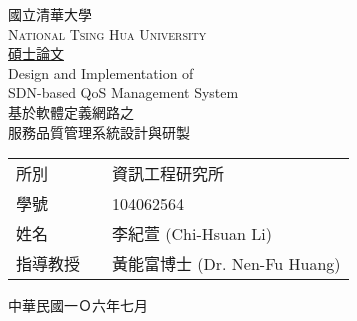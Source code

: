 \begin{center}
{\fontsize{32}{36}\selectfont 國立清華大學} \\
\large{\scshape National Tsing Hua University} \\
\vspace*{6ex}
\underline{\LARGE 碩士論文} \\

\null
\vfill
\Huge Design and Implementation of \\ SDN-based QoS Management System \\
\vspace*{6ex}
\LARGE
基於軟體定義網路之 \\
服務品質管理系統設計與研製 \\

\null
\vfill

\large
\begin{tabular}{ll}
所別~~~     &資訊工程研究所                    \\[2ex]
學號~~~     &104062564                       \\[2ex]
姓名~~~     &李紀萱 (Chi-Hsuan Li)            \\[2ex]
指導教授~~  &黃能富博士 (Dr. Nen-Fu Huang)      \\[2ex]
\end{tabular}

\vspace*{6ex}
\Large 中華民國一Ｏ六年七月
\end{center}
